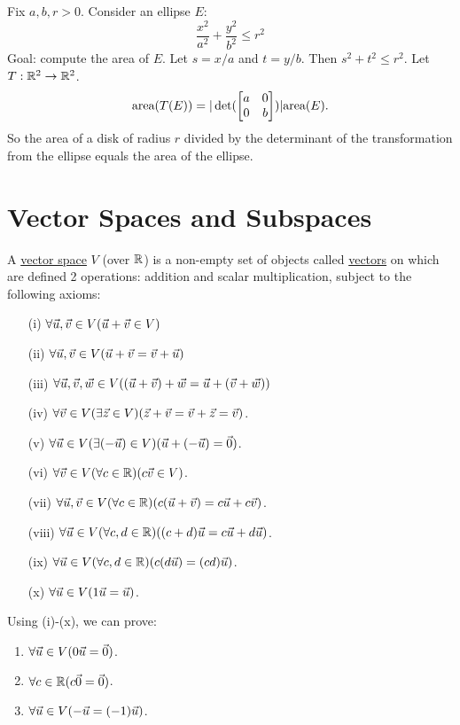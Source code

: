 \documentclass[10pt,a4paper]{article}
\begin{document}
\begin{example}
	Fix $a,b,r>0$. Consider an ellipse $E$: $$\frac{x^2}{a^2}+\frac{y^2}{b^2} \leq r^2$$ Goal: compute the area of $E$. Let $s=x/a$ and $t=y/b$. Then $s^2+t^2\leq r^2$. Let $T:\mathbb{R}^2 \rightarrow \mathbb{R}^2$. $$\text{area}(T(E)) = |\det(\begin{bmatrix}a & 0 \\ 0 & b\end{bmatrix})|\text{area}(E).$$ So the area of a disk of radius $r$ divided by the determinant of the transformation from the ellipse equals the area of the ellipse.
\end{example}

\section{Vector Spaces and Subspaces}
\begin{definition}
	A \underline{vector space} $V$ (over $\mathbb{R}$) is a non-empty set of objects called \underline{vectors} on which are defined 2 operations: addition and scalar multiplication, subject to the following axioms: %
	\begin{enumerate}
		\item[(i)] $\forall\vec{u},\vec{v}\in V(\vec{u} + \vec{v} \in V)$
		\item[(ii)] $\forall\vec{u},\vec{v}\in V(\vec{u} + \vec{v} = \vec{v} + \vec{u})$
		\item[(iii)] $\forall\vec{u},\vec{v},\vec{w}\in V((\vec{u} + \vec{v}) + \vec{w} = \vec{u} + (\vec{v}+\vec{w}))$
		\item[(iv)] $\forall \vec{v}\in V (\exists \vec{z} \in V )(\vec{z}+\vec{v} = \vec{v}+\vec{z} = \vec{v})$.
		\item[(v)] $\forall \vec{u}\in V (\exists (-\vec{u})\in V)(\vec{u}+(-\vec{u}) = \vec{0})$.
		\item[(vi)] $\forall \vec{v}\in V(\forall c\in\mathbb{R})(c\vec{v}\in V)$.
		\item[(vii)] $\forall\vec{u},\vec{v}\in V (\forall c\in\mathbb{R})(c(\vec{u}+\vec{v}) = c\vec{u} + c\vec{v})$.
		\item[(viii)] $\forall\vec{u}\in V(\forall c,d\in\mathbb{R})((c+d)\vec{u} = c\vec{u} + d\vec{u})$.
		\item[(ix)] $\forall\vec{u}\in V(\forall c,d\in\mathbb{R})(c(d\vec{u}) = (cd)\vec{u})$.
		\item[(x)] $\forall\vec{u}\in V(1\vec{u} = \vec{u})$.
	\end{enumerate}
\end{definition}
\begin{remark}
Using (i)-(x), we can prove: 
\begin{enumerate}
	\item $\forall\vec{u}\in V (0\vec{u} = \vec{0})$. 
	\item $\forall c\in\mathbb{R} (c\vec{0} = \vec{0})$. 
	\item $\forall \vec{u}\in V(-\vec{u} = (-1)\vec{u})$.
\end{enumerate}
\end{remark}
\end{document}
